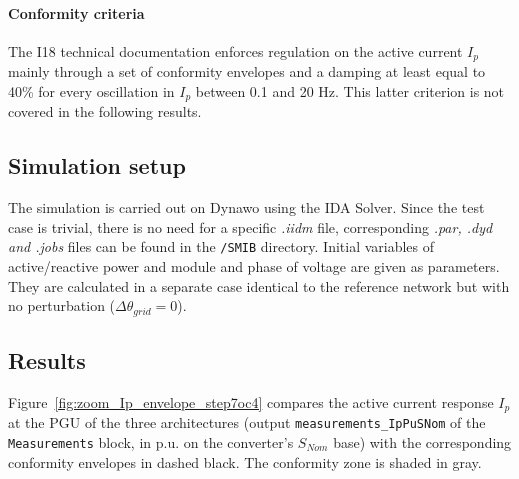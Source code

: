\documentclass[a4paper, 12pt]{report}
\begin{document}
\paragraph{Conformity criteria}
The I18 technical documentation enforces regulation on the active current $I_p$ mainly through a set of conformity envelopes and a damping at least equal to 40\% for every oscillation in $I_p$ between 0.1 and 20 Hz. This latter criterion is not covered in the
following results.
\subsection*{Simulation setup}
The simulation is carried out on Dynawo using the IDA Solver.
Since the test case is trivial, there is no need for a specific \textit{.iidm} file, corresponding \textit{.par, .dyd and .jobs} files can be found in the \texttt{/SMIB} directory. Initial variables of active/reactive power and module and phase of voltage are given
as parameters. They are calculated in a separate case identical to the reference network but with no perturbation ($\Delta\theta_{grid}=0$).

\subsection*{Results}

Figure~\ref{fig:zoom_Ip_envelope_step7oc4} compares the active current response $I_p$ at the PGU of the three architectures (output \texttt{measurements\_IpPuSNom} of the \texttt{Measurements} block, in p.u. on the converter's $S_{Nom}$ base) with the corresponding conformity envelopes in dashed black. The conformity zone is shaded in gray.
\end{document}
